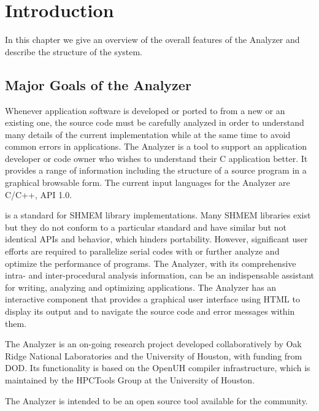 \section{Introduction}
\label{chapter:introduction}

In this chapter we give an overview of the overall features of the
\openshmem Analyzer and describe the structure of the system.

\subsection{Major Goals of the \openshmem Analyzer}

Whenever application software is developed or ported to \openshmem
from a new or an existing one, the source code must be carefully
analyzed in order to understand many details of the current
implementation while at the same time to avoid common errors in
\openshmem applications. The \openshmem Analyzer is a tool to support
an application developer or code owner who wishes to understand their
C application better. It provides a range of information including the
structure of a source program in a graphical browsable form. The
current input languages for the \openshmem Analyzer are C/C++,
\openshmem API 1.0.

\openshmem is a standard for SHMEM library implementations. Many SHMEM
libraries exist but they do not conform to a particular standard and
have similar but not identical APIs and behavior, which hinders
portability. However, significant user efforts are required to
parallelize serial codes with \openshmem or further analyze and
optimize the performance of \openshmem programs. The \openshmem
Analyzer, with its comprehensive intra- and inter-procedural analysis
information, can be an indispensable assistant for writing, analyzing
and optimizing \openshmem applications.  The \openshmem Analyzer has
an interactive component that provides a graphical user interface
using HTML to display its output and to navigate the source code and
error messages within them.

The \openshmem Analyzer is an on-going research project developed
collaboratively by Oak Ridge National Laboratories and the University of
Houston, with funding from DOD. Its functionality is based on the OpenUH
compiler infrastructure, which is maintained by the HPCTools Group at the
University of Houston.

The \openshmem Analyzer is intended to be an open source tool
available for the \openshmem community.
